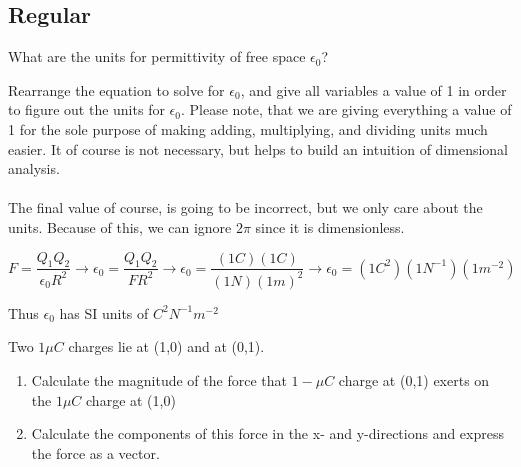

\subsection*{Regular}

\begin{question}
What are the units for permittivity of free space $\epsilon_0$?

\end{question}

\begin{solution}

Rearrange the equation to solve for $\epsilon_0$, and give all variables a value of 1 in order to figure out the units for $\epsilon_0$. Please note, that we are giving everything a value of 1 for the sole purpose of making adding, multiplying, and dividing units much easier. It of course is not necessary, but helps to build an intuition of dimensional analysis.
\\\\
The final value of course, is going to be incorrect, but we only care about the units. Because of this, we can ignore $2\pi$ since it is dimensionless.

\begin{equation*}
F = \frac{Q_1Q_2}{\epsilon_0R^2} \rightarrow
\epsilon_0 = \frac{Q_1Q_2}{FR^2} \rightarrow
\epsilon_0 = \frac{(1C)(1C)}{(1N)(1m)^2} \rightarrow
\epsilon_0 = (1C^2)(1N^{-1})(1m^{-2})
\end{equation*}

Thus $\epsilon_0$ has SI units of $C^2N^{-1}m^{-2}$
\end{solution}


\begin{question}
Two $1\mu C$ charges lie at (1,0) and at (0,1).
\begin{enumerate}[label=(\alph*)]
    \item Calculate the magnitude of the force that $1-\mu C$ charge at (0,1) exerts on the $1\mu C$ charge at (1,0)
    \item Calculate the components of this force in the x- and y-directions and express the force as a vector.
\end{enumerate}
\end{question}

